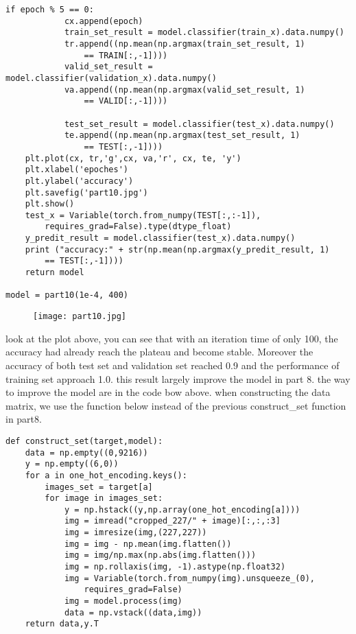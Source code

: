 \documentclass{article}
\begin{document}
\begin{lstlisting}[basicstyle=\large\ttfamily]
        if epoch % 5 == 0:
            cx.append(epoch)
            train_set_result = model.classifier(train_x).data.numpy()
            tr.append((np.mean(np.argmax(train_set_result, 1) 
                == TRAIN[:,-1])))
            valid_set_result = model.classifier(validation_x).data.numpy()
            va.append((np.mean(np.argmax(valid_set_result, 1) 
                == VALID[:,-1])))
            
            test_set_result = model.classifier(test_x).data.numpy()
            te.append((np.mean(np.argmax(test_set_result, 1) 
                == TEST[:,-1])))
    plt.plot(cx, tr,'g',cx, va,'r', cx, te, 'y')
    plt.xlabel('epoches')
    plt.ylabel('accuracy')
    plt.savefig('part10.jpg')
    plt.show()
    test_x = Variable(torch.from_numpy(TEST[:,:-1]),
        requires_grad=False).type(dtype_float)
    y_predit_result = model.classifier(test_x).data.numpy()
    print ("accuracy:" + str(np.mean(np.argmax(y_predit_result, 1) 
        == TEST[:,-1])))
    return model
    
model = part10(1e-4, 400)
\end{lstlisting}

\begin{figure}[!htb]
  \texttt{[image: part10.jpg]}
  \caption*{}\label{fig:part4}
\end{figure}

look at the plot above, you can see that with an iteration time of only 100, the accuracy had already reach the plateau and become stable. Moreover the accuracy of both test set and validation set reached 0.9 and the performance of training set approach 1.0. this result largely improve the model in part 8.
the way to improve the model are in the code bow above.
when constructing the data matrix, we use the function below instead of the previous construct\_set function in part8.
\Large\begin{lstlisting}[basicstyle=\large\ttfamily]
def construct_set(target,model):
    data = np.empty((0,9216))
    y = np.empty((6,0))
    for a in one_hot_encoding.keys():
        images_set = target[a]
        for image in images_set:
            y = np.hstack((y,np.array(one_hot_encoding[a])))
            img = imread("cropped_227/" + image)[:,:,:3]
            img = imresize(img,(227,227))
            img = img - np.mean(img.flatten())
            img = img/np.max(np.abs(img.flatten()))
            img = np.rollaxis(img, -1).astype(np.float32)
            img = Variable(torch.from_numpy(img).unsqueeze_(0),
                requires_grad=False)
            img = model.process(img)
            data = np.vstack((data,img))
    return data,y.T
\end{lstlisting}
\end{document}
